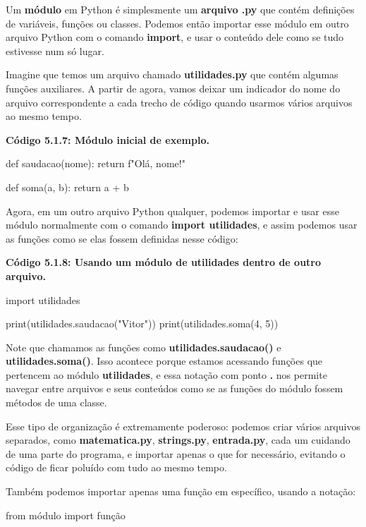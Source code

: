 \documentclass[11pt, a4paper]{article}
\begin{document}
Um \textbf{módulo} em Python é simplesmente um \textbf{arquivo .py} que contém definições de variáveis, funções ou classes. Podemos então importar esse módulo em outro arquivo Python com o comando \textbf{import}, e usar o conteúdo dele como se tudo estivesse num só lugar.

Imagine que temos um arquivo chamado \textbf{utilidades.py} que contém algumas funções auxiliares. A partir de agora, vamos deixar um indicador do nome do arquivo correspondente a cada trecho de código quando usarmos vários arquivos ao mesmo tempo.

\textbf{Código 5.1.7: Módulo inicial de exemplo.}

\begin{code}
def saudacao(nome):
    return f"Olá, {nome}!"

def soma(a, b):
    return a + b
\end{code}

Agora, em um outro arquivo Python qualquer, podemos importar e usar esse módulo normalmente com o comando \textbf{import utilidades}, e assim podemos usar as funções como se elas fossem definidas nesse código:

\textbf{Código 5.1.8: Usando um módulo de utilidades dentro de outro arquivo.}

\begin{code}
import utilidades

print(utilidades.saudacao("Vitor"))
print(utilidades.soma(4, 5))
\end{code}

Note que chamamos as funções como \textbf{utilidades.saudacao()} e \textbf{utilidades.soma()}. Isso acontece porque estamos acessando funções que pertencem ao módulo \textbf{utilidades}, e essa notação com ponto \textbf{.} nos permite navegar entre arquivos e seus conteúdos como se as funções do módulo fossem métodos de uma classe.

Esse tipo de organização é extremamente poderoso: podemos criar vários arquivos separados, como \textbf{matematica.py}, \textbf{strings.py}, \textbf{entrada.py}, cada um cuidando de uma parte do programa, e importar apenas o que for necessário, evitando o código de ficar poluído com tudo ao mesmo tempo.

Também podemos importar apenas uma função em específico, usando a notação:

\begin{code}
from módulo import função
\end{code}
\end{document}
